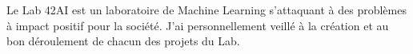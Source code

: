 Le Lab 42AI est un laboratoire de Machine Learning s'attaquant à des problèmes à impact positif pour la société.
J'ai personnellement veillé à la création et au bon déroulement de chacun des projets du Lab.

\sectionspace
